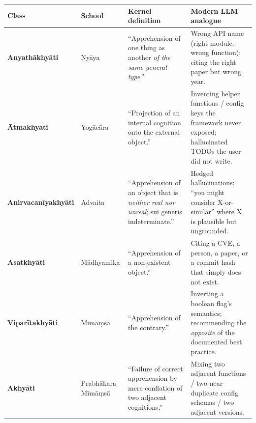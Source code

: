 {\def\LTcaptype{none} %
\begin{longtable}[]{@{}
  >{\raggedright\arraybackslash}p{}
  >{\raggedright\arraybackslash}p{}
  >{\raggedright\arraybackslash}p{}
  >{\raggedright\arraybackslash}p{}@{}}
\toprule\noalign{}
\begin{minipage}[b]{\linewidth}\raggedright
Class
\end{minipage} & \begin{minipage}[b]{\linewidth}\raggedright
School
\end{minipage} & \begin{minipage}[b]{\linewidth}\raggedright
Kernel definition
\end{minipage} & \begin{minipage}[b]{\linewidth}\raggedright
Modern LLM analogue
\end{minipage} \\
\midrule\noalign{}
\endhead
\bottomrule\noalign{}
\endlastfoot
\textbf{Anyathākhyāti} & Nyāya & ``Apprehension of one thing as another \emph{of the same general type}.'' & Wrong API name (right module, wrong function); citing the right paper but wrong year. \\
\textbf{Ātmakhyāti} & Yogācāra & ``Projection of an internal cognition onto the external object.'' & Inventing helper functions / config keys the framework never exposed; hallucinated TODOs the user did not write. \\
\textbf{Anirvacanīyakhyāti} & Advaita & ``Apprehension of an object that is \emph{neither real nor unreal}; sui generis indeterminate.'' & Hedged hallucinations: ``you might consider X-or-similar'' where X is plausible but ungrounded. \\
\textbf{Asatkhyāti} & Mādhyamika & ``Apprehension of a non-existent object.'' & Citing a CVE, a person, a paper, or a commit hash that simply does not exist. \\
\textbf{Viparītakhyāti} & Mīmāṃsā & ``Apprehension of the contrary.'' & Inverting a boolean flag's semantics; recommending the \emph{opposite} of the documented best practice. \\
\textbf{Akhyāti} & Prabhākara Mīmāṃsā & ``Failure of correct apprehension by mere conflation of two adjacent cognitions.'' & Mixing two adjacent functions / two near-duplicate config schemas / two adjacent versions. \\
\end{longtable}
}

